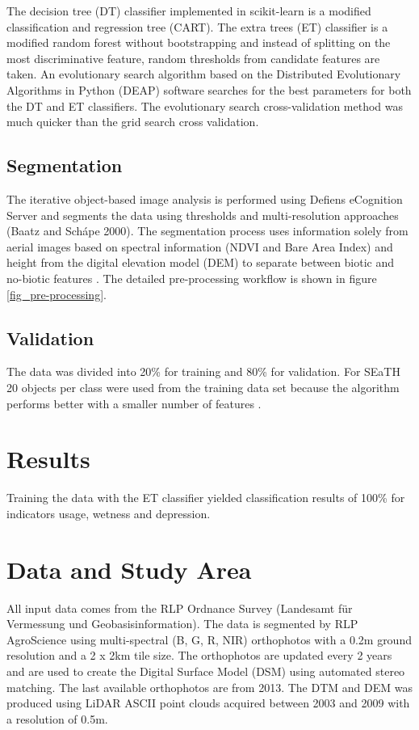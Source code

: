 \documentclass[authoryear, review,12pt,number]{elsarticle}
\begin{document}
The decision tree (DT) classifier implemented in scikit-learn is a modified
classification and regression tree (CART)\citep{scikit-learn}. The extra trees
(ET) classifier is a modified random forest without bootstrapping and instead of
splitting on the most discriminative feature, random thresholds from candidate
features are taken.
An evolutionary search algorithm based on the Distributed Evolutionary
Algorithms in Python (DEAP) \citep{DEAP_JMLR2012} software searches
for the best parameters for both the DT and ET classifiers. The evolutionary
search cross-validation method was much quicker than the grid search cross
validation. 
\subsection{Segmentation} 
\label{subsec_segmentation}
The iterative object-based image analysis is performed using Defiens eCognition
Server and segments the data using thresholds and multi-resolution approaches
(Baatz and Sch\'ape 2000). The segmentation process uses information solely from
aerial images based on spectral information (NDVI and Bare Area Index) and
height from the digital elevation model (DEM) to separate between biotic and
no-biotic features \citep{Tintrup2015}. The detailed pre-processing workflow is
shown in figure \ref{fig_pre-processing}.
\subsection{Validation} 
The data was divided into 20\% for training and 80\% for validation. For SEaTH
20 objects per class were used from the training data set because the algorithm
performs better with a smaller number of features \citep{Nussbaum2006}. 
\section{Results}
Training  the data with the ET classifier yielded classification results of
100\% for indicators usage, wetness and depression.
\section{Data and Study Area}
All input data comes from the RLP Ordnance Survey (Landesamt f\"ur Vermessung 
und Geobasisinformation). The data is segmented by RLP AgroScience using
multi-spectral (B, G, R, NIR) orthophotos with a 0.2m ground resolution and a
2 x 2km tile size. The orthophotos are updated every 2 years and are used to
create the Digital Surface Model (DSM) using automated stereo matching. The
last available orthophotos are from 2013. The DTM and
DEM was produced using LiDAR ASCII point clouds acquired between 2003 and 2009
with a resolution of 0.5m.\\
\end{document}
